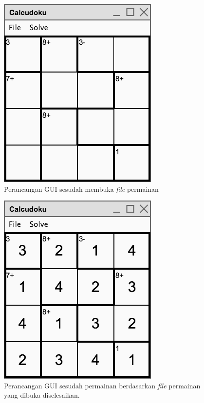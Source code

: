 \begin{figure}
\centering
\captionsetup{justification=centering}
\includegraphics[scale=0.5]{Gambar/Perancangan/PerancanganGUI2.png}
\caption[Perancangan GUI sesudah \textit{file} permainan dibuka.]{Perancangan GUI sesudah membuka \textit{file} permainan}
\label{fig:perancangangui2}
\end{figure}

\begin{figure}
\centering
\captionsetup{justification=centering}
\includegraphics[scale=0.5]{Gambar/Perancangan/PerancanganGUI3.png}
\caption[Perancangan GUI sesudah permainan berdasarkan \textit{file} permainan yang dibuka diselesaikan.]{Perancangan GUI sesudah permainan berdasarkan \textit{file} permainan yang dibuka diselesaikan.}
\label{fig:perancangangui3}
\end{figure}

